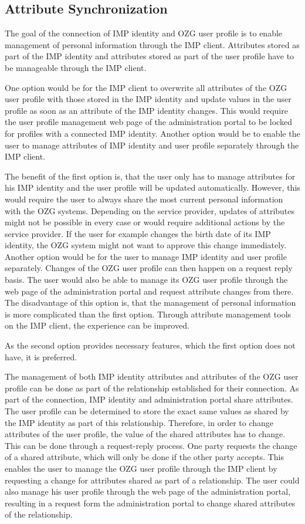 \subsection{Attribute Synchronization}

The goal of the connection of IMP identity and OZG user profile is to enable management of personal information through the IMP client. Attributes stored as part of the IMP identity and attributes stored as part of the user profile have to be manageable through the IMP client.

One option would be for the IMP client to overwrite all attributes of the OZG user profile with those stored in the IMP identity and update values in the user profile as soon as an attribute of the IMP identity changes. This would require the user profile management web page of the administration portal to be locked for profiles with a connected IMP identity. Another option would be to enable the user to manage attributes of IMP identity and user profile separately through the IMP client.

The benefit of the first option is, that the user only has to manage attributes for his IMP identity and the user profile will be updated automatically. However, this would require the user to always share the most current personal information with the OZG systems. Depending on the service provider, updates of attributes might not be possible in every case or would require additional actions by the service provider. If the user for example changes the birth date of its IMP identity, the OZG system might not want to approve this change immediately. Another option would be for the user to manage IMP identity and user profile separately. Changes of the OZG user profile can then happen on a request reply basis. The user would also be able to manage its OZG user profile through the web page of the administration portal and request attribute changes from there. The disadvantage of this option is, that the management of personal information is more complicated than the first option. Through attribute management tools on the IMP client, the experience can be improved.

As the second option provides necessary features, which the first option does not have, it is preferred.

The management of both IMP identity attributes and attributes of the OZG user profile can be done as part of the relationship established for their connection. As part of the connection, IMP identity and administration portal share attributes. The user profile can be determined to store the exact same values as shared by the IMP identity as part of this relationship. Therefore, in order to change attributes of the user profile, the value of the shared attributes has to change. This can be done through a request-reply process. One party requests the change of a shared attribute, which will only be done if the other party accepts. This enables the user to manage the OZG user profile through the IMP client by requesting a change for attributes shared as part of a relationship. The user could also manage his user profile through the web page of the administration portal, resulting in a request form the administration portal to change shared attributes of the relationship.

